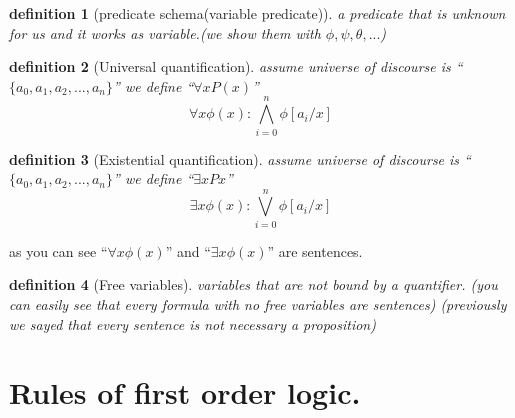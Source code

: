 \documentclass[10pt,a4paper]{book}
\newtheorem{definition}{definition}[section]
\begin{document}
%

\begin{definition}
    [predicate schema(variable predicate)] a predicate that is unknown
    for us and it works as variable.(we show them with $\phi ,\psi ,\theta ,... $)
\end{definition}

\begin{definition}
    [Universal quantification] assume universe of discourse is ``$ \{a_{0},a_{1},a_{2},...,a_{n}\}$''
    we define ``$\forall x P(x)$''
    \\
    \[ \forall x \phi(x) : \bigwedge\limits_{i=0}^n \phi[a_{i}/x] \]
\end{definition}

\begin{definition}
    [Existential quantification] assume universe of discourse is ``$ \{a_{0},a_{1},a_{2},...,a_{n}\}$''
    we define ``$\exists x Px$''
    \\
    \[ \exists  x \phi(x) : \bigvee\limits_{i=0}^n \phi[a_{i}/x] \]
\end{definition}

as you can see ``$\forall x \phi (x) $'' and ``$\exists x \phi (x) $'' are
sentences.

\begin{definition}
    [Free variables] variables that are not bound by a quantifier.
    (you can easily see that every formula with no free variables are sentences)
    (previously we sayed that every sentence is not necessary a proposition)
\end{definition}

\section{Rules of first order logic.}
\end{document}
